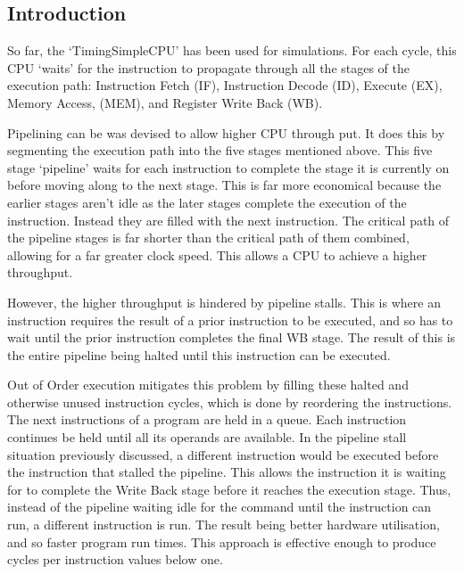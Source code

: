 %
%



\subsection{Introduction}
So far, the `TimingSimpleCPU' has been used for simulations. For each cycle,
this CPU `waits' for the instruction to propagate through all the stages of the
execution path: Instruction Fetch (IF), Instruction Decode (ID), Execute (EX),
Memory Access, (MEM), and Register Write Back (WB).

Pipelining can be was devised to allow higher CPU through put. It does this by
segmenting the execution path into the five stages mentioned above. This five
stage `pipeline' waits for each instruction to complete the stage it is
currently on before moving along to the next stage.  This is far more economical
because the earlier stages aren't idle as the later stages complete the
execution of the instruction. Instead they are filled with the next instruction.
The critical path of the pipeline stages is far shorter than the critical path
of them combined, allowing for a far greater clock speed.  This allows a CPU to
achieve a higher throughput.

However, the higher throughput is hindered by pipeline stalls. This is where an
instruction requires the result of a prior instruction to be executed, and so
has to wait until the prior instruction completes the final WB stage.  The
result of this is the entire pipeline being halted until this instruction can be
executed.

Out of Order execution mitigates this problem by filling these halted and
otherwise unused instruction cycles, which is done by reordering the
instructions.  The next instructions of a program are held in a queue.  Each
instruction continues be held until all its operands are available.  In the
pipeline stall situation previously discussed, a different instruction would be
executed before the instruction that stalled the pipeline. This allows the
instruction it is waiting for to complete the Write Back stage before it reaches
the execution stage. Thus, instead of the pipeline waiting idle for the command
until the instruction can run, a different instruction is run.  The result being
better hardware utilisation, and so faster program run times.  This approach is
effective enough to produce cycles per instruction values below one.
\cite{Dwyer1992}

